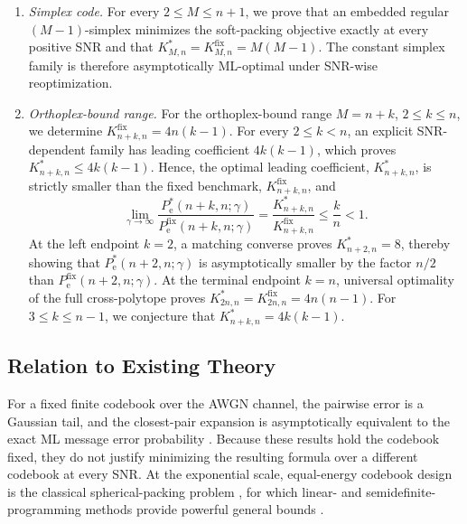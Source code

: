 \documentclass[12pt,draftclsnofoot,onecolumn]{IEEEtran}
\newcommand{\Pe}{P_{\mathrm e}}
\theoremstyle{definition}
\begin{document}
\begin{enumerate}
\item \emph{Simplex code.}
For every \(2\leq M\leq n+1\), we prove that an embedded regular
\((M-1)\)-simplex minimizes the soft-packing objective exactly at every
positive SNR and that
\(K^{\ast}_{M,n}=K^{\mathrm{fix}}_{M,n}=M(M-1)\).  The constant simplex
family is therefore asymptotically ML-optimal under SNR-wise reoptimization.


\item \emph{Orthoplex-bound range.}
For the orthoplex-bound range \(M=n+k\),
\(2\leq k\leq n\), we determine
\(K^{\mathrm{fix}}_{n+k,n}=4n(k-1)\).  For every \(2\leq k<n\), an
explicit SNR-dependent family has leading coefficient \(4k(k-1)\),
which proves \(K^{\ast}_{n+k,n}\leq 4k(k-1)\).  Hence, the optimal leading
coefficient, \(K^{\ast}_{n+k,n}\), is strictly smaller than the fixed benchmark, \(K^{\mathrm{fix}}_{n+k,n}\), and
\begin{equation*}
  \lim_{\gamma\to\infty}
  \frac{\Pe^{\ast}(n+k,n;\gamma)}
       {\Pe^{\mathrm{fix}}(n+k,n;\gamma)}
  =
  \frac{K^{\ast}_{n+k,n}}{K^{\mathrm{fix}}_{n+k,n}}
  \leq \frac{k}{n}<1.
\end{equation*}
At
the left endpoint \(k=2\), a matching converse proves
\(K^{\ast}_{n+2,n}=8\), thereby showing that
\(\Pe^{\ast}(n+2,n;\gamma)\) is asymptotically smaller by the factor
\(n/2\) than \(\Pe^{\mathrm{fix}}(n+2,n;\gamma)\).  At the terminal
endpoint \(k=n\), universal optimality of
the full cross-polytope proves
\(K^{\ast}_{2n,n}=K^{\mathrm{fix}}_{2n,n}=4n(n-1)\).  For
\(3\leq k\leq n-1\), we conjecture that
\(K^{\ast}_{n+k,n}=4k(k-1)\).
\end{enumerate}

\subsection{Relation to Existing Theory}
\label{subsec:related-work}

For a fixed finite codebook over the AWGN channel, the pairwise error is
a Gaussian tail, and the closest-pair expansion is asymptotically
equivalent to the exact ML message error probability
\cite{Proakis2001,AlvaradoAgrellBrannstrom2018}.  Because these results
hold the codebook fixed, they do not justify minimizing the resulting
formula over a different codebook at every SNR.  At the exponential
scale, equal-energy codebook design is the classical spherical-packing
problem
\cite{Shannon1959,Rankin1955,ConwaySloane1999,EricsonZinoviev2001}, for
which linear- and semidefinite-programming methods provide powerful
general bounds
\cite{DelsarteGoethalsSeidel1977,Levenshtein1998,
BachocVallentin2008,BachocVallentin2009}.
\end{document}
